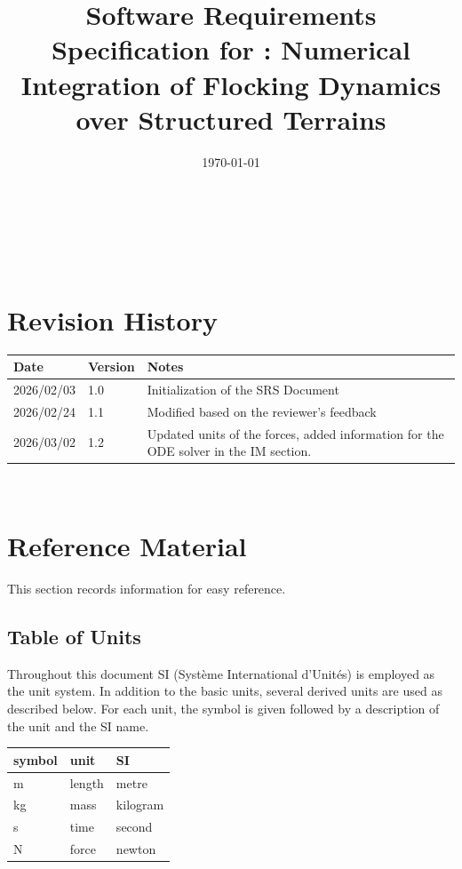\documentclass[12pt]{article}
\begin{document}
\title{Software Requirements Specification for \progname: Numerical Integration 
of Flocking Dynamics over Structured Terrains} 
\author{\authname}
\date{\today}
	
\maketitle

~\newpage


\tableofcontents

~\newpage

\section*{Revision History}

\begin{tabularx}{\textwidth}{p{3cm}p{2cm}X}
\toprule {\bf Date} & {\bf Version} & {\bf Notes}\\
\midrule
2026/02/03 & 1.0 & Initialization of the SRS Document\\
2026/02/24 & 1.1 & Modified based on the reviewer's feedback\\
2026/03/02 & 1.2 & Updated units of the forces, added information for the ODE solver in the IM section.\\
\bottomrule
\end{tabularx}


~\newpage

\section{Reference Material}

This section records information for easy reference.

\subsection{Table of Units}

Throughout this document SI (Syst\`{e}me International d'Unit\'{e}s) is employed
as the unit system.  In addition to the basic units, several derived units are
used as described below.  For each unit, the symbol is given followed by a
description of the unit and the SI name.
~\newline

\renewcommand{\arraystretch}{1.2}
  \noindent \begin{tabular}{l l l} 
    \toprule		
    \textbf{symbol} & \textbf{unit} & \textbf{SI}\\
    \midrule 
    \si{\metre} & length & metre\\
    \si{\kilogram} & mass	& kilogram\\
    \si{\second} & time & second\\
    \si{\newton} & force & newton\\
    \bottomrule
  \end{tabular}
\end{document}
